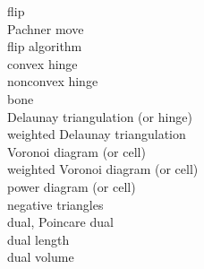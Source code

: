 \begin{description}
\item[flip] 

\item[Pachner move] 

\item[flip algorithm] 

\item[convex hinge] 

\item[nonconvex hinge] 

\item[bone] 

\item[Delaunay triangulation (or hinge)] 

\item[weighted Delaunay triangulation] 

\item[Voronoi diagram (or cell)] 

\item[weighted Voronoi diagram (or cell)] 

\item[power diagram (or cell)] 

\item[negative triangles] 

\item[dual, Poincare dual] 

\item[dual length] 

\item[dual volume] 
\end{description}
